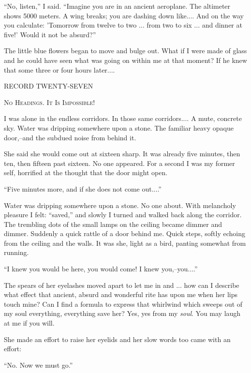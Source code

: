 \documentclass[11pt,openany]{book}
\begin{document}
``No, listen,'' I said. ``Imagine you are in an ancient aeroplane. The altimeter shows 5000 meters. A wing breaks; you are dashing down like.... And on the way you calculate: 'Tomorrow from twelve to two ... from two to six ... and dinner at five!' Would it not be absurd?''

The little blue flowers began to move and bulge out. What if I were made of glass and he could have seen what was going on within me at that moment? If he knew that some three or four hours later....

\begin{center}\textsc{RECORD TWENTY-SEVEN}\end{center}

\begin{center}\textsc{No Headings. It Is Impossible!}\end{center}

I was alone in the endless corridors. In those same corridors.... A mute, concrete sky. Water was dripping somewhere upon a stone. The familiar heavy opaque door,--and the subdued noise from behind it.

She said she would come out at sixteen sharp. It was already five minutes, then ten, then fifteen past sixteen. No one appeared. For a second I was my former self, horrified at the thought that the door might open.

``Five minutes more, and if she does not come out....''

Water was dripping somewhere upon a stone. No one about. With melancholy pleasure I felt: ``saved,'' and slowly I turned and walked back along the corridor. The trembling dots of the small lamps on the ceiling became dimmer and dimmer. Suddenly a quick rattle of a door behind me. Quick steps, softly echoing from the ceiling and the walls. It was she, light as a bird, panting somewhat from running.

``I knew you would be here, you would come! I knew you,--you....''

The spears of her eyelashes moved apart to let me in and ... how can I describe what effect that ancient, absurd and wonderful rite has upon me when her lips touch mine? Can I find a formula to express that whirlwind which sweeps out of my soul everything, everything save her? Yes, yes from my \emph{soul}. You may laugh at me if you will.

She made an effort to raise her eyelids and her slow words too came with an effort:

``No. Now we must go.''
\end{document}
